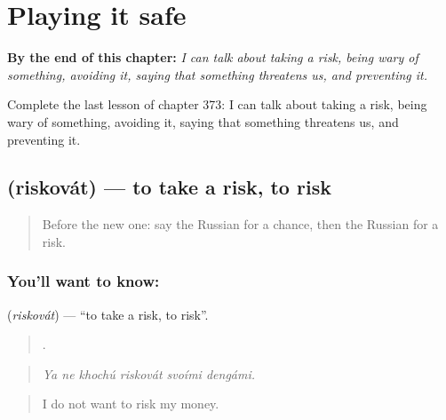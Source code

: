 
\chapter{Playing it safe}
\label{ch:ru-playing-it-safe}

\begin{chapteropening}
\textbf{By the end of this chapter:} \emph{I can talk about taking a risk, being wary of something, avoiding it, saying that something threatens us, and preventing it.}

Complete the last lesson of chapter 373: I can talk about taking a risk, being wary of something, avoiding it, saying that something threatens us, and preventing it.
\end{chapteropening}

\section[\texorpdfstring{\ru{рисковать} (riskovát)}{рисковать (riskovát)}]{ (riskovát) — to take a risk, to risk}

\label{lesson:RU-C373-riskovat}



\begin{quote}
Before the new one: say the Russian for a chance, then the Russian for a risk.
\end{quote}

\subsection*{You'll want to know: }
\textbf{} (\emph{riskovát}) — \textquotedblleft{}to take a risk, to risk\textquotedblright{}.

\begin{quote}
     .
\end{quote}

\begin{quote}
\emph{Ya ne khochú riskovát svoími dengámi.}
\end{quote}

\begin{quote}
I do not want to risk my money.
\end{quote}

